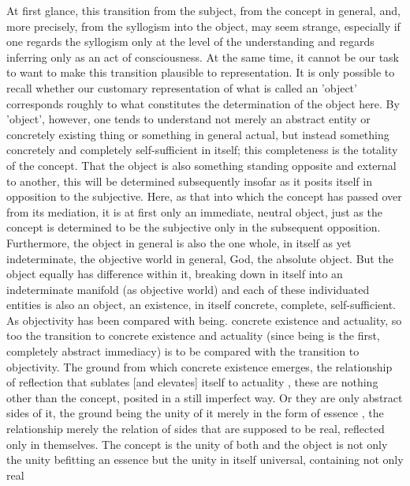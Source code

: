     At first glance, this transition from the subject,
    from the concept in general, and, more precisely,
    from the syllogism into the object, may seem strange,
    especially if one regards the syllogism only at the
    level of the understanding and regards inferring only as
    an act of consciousness.
    At the same time, it cannot be our task to want
    to make this transition plausible to representation.
    It is only possible to recall whether our customary representation
    of what is called an 'object' corresponds roughly to
    what constitutes the determination of the object here.
    By 'object', however, one tends to understand not merely
    an abstract entity or concretely existing thing or
    something in general actual, but instead something
    concretely and completely self-sufficient in itself;
    this completeness is the totality of the concept.
    That the object is also something standing
    opposite and external to another,
    this will be determined subsequently insofar as
    it posits itself in opposition to the subjective.
    Here, as that into which the concept has passed over from its mediation,
    it is at first only an immediate, neutral object,
    just as the concept is determined to be the subjective
    only in the subsequent opposition.
    Furthermore, the object in general is also the one whole,
    in itself as yet indeterminate, the objective world in general,
    God, the absolute object.
    But the object equally has difference within it, breaking
    down in itself into an indeterminate manifold (as objective world)
    and each of these individuated entities is also an object, an existence,
    in itself concrete, complete, self-sufficient.
    As objectivity has been compared with being. concrete existence
    and actuality, so too the transition to concrete existence
    and actuality (since being is the first, completely abstract
    immediacy) is to be compared with the transition to objectivity.
    The ground from which concrete existence emerges, the relationship
    of reflection that sublates [and elevates] itself to actuality ,
    these are nothing other than the concept,
    posited in a still imperfect way. Or they are only abstract sides of it,
    the ground being the unity of it merely in the form of essence ,
    the relationship merely the relation of sides that are
    supposed to be real, reflected only in themselves. The concept is the
    unity of both and the object is not only the unity befitting an
    essence but the unity in itself universal, containing not only real
